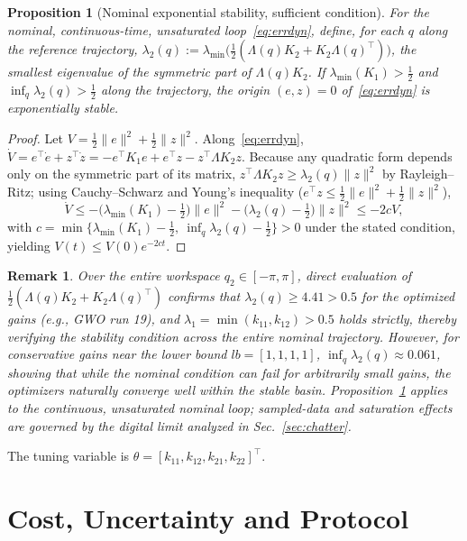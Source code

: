 \documentclass[10pt,journal,compsoc]{IEEEtran}
\newtheorem{proposition}{Proposition}
\newtheorem{remark}{Remark}
\begin{document}
\begin{proposition}[Nominal exponential stability, sufficient condition]\label{prop:stability}
For the nominal, continuous-time, unsaturated loop~\eqref{eq:errdyn}, define, for each $q$ along the reference trajectory, $\lambda_2(q):=\lambda_{\min}\bigl(\tfrac12(\Lambda(q)K_2+K_2\Lambda(q)^\top)\bigr)$, the smallest eigenvalue of the symmetric part of $\Lambda(q)K_2$. If $\lambda_{\min}(K_1)>\tfrac12$ and $\inf_q\lambda_2(q)>\tfrac12$ along the trajectory, the origin $(e,z)=0$ of~\eqref{eq:errdyn} is exponentially stable.
\end{proposition}
\begin{proof}
Let $V=\tfrac12\|e\|^2+\tfrac12\|z\|^2$. Along~\eqref{eq:errdyn}, $\dot V=e^\top\dot e+z^\top\dot z=-e^\top K_1e+e^\top z-z^\top\Lambda K_2z$. Because any quadratic form depends only on the symmetric part of its matrix, $z^\top\Lambda K_2z\ge\lambda_2(q)\|z\|^2$ by Rayleigh--Ritz; using Cauchy--Schwarz and Young's inequality ($e^\top z\le\tfrac12\|e\|^2+\tfrac12\|z\|^2$),
\[
\dot V\le-\bigl(\lambda_{\min}(K_1)-\tfrac12\bigr)\|e\|^2-\bigl(\lambda_2(q)-\tfrac12\bigr)\|z\|^2\le-2cV,
\]
with $c=\min\{\lambda_{\min}(K_1)-\tfrac12,\ \inf_q\lambda_2(q)-\tfrac12\}>0$ under the stated condition, yielding $V(t)\le V(0)e^{-2ct}$.
\end{proof}
\begin{remark}
Over the entire workspace $q_2\in[-\pi,\pi]$, direct evaluation of $\tfrac12(\Lambda(q)K_2+K_2\Lambda(q)^\top)$ confirms that $\lambda_2(q)\ge 4.41 > 0.5$ for the optimized gains (e.g., GWO run 19), and $\lambda_1=\min(k_{11},k_{12})>0.5$ holds strictly, thereby verifying the stability condition across the entire nominal trajectory. However, for conservative gains near the lower bound $lb=[1,1,1,1]$, $\inf_q\lambda_2(q)\approx0.061$, showing that while the nominal condition can fail for arbitrarily small gains, the optimizers naturally converge well within the stable basin. Proposition~\ref{prop:stability} applies to the continuous, unsaturated nominal loop; sampled-data and saturation effects are governed by the digital limit analyzed in Sec.~\ref{sec:chatter}.
\end{remark}

The tuning variable is $\theta=[k_{11},k_{12},k_{21},k_{22}]^\top$.

\section{Cost, Uncertainty and Protocol}\label{sec:cost}
\end{document}
